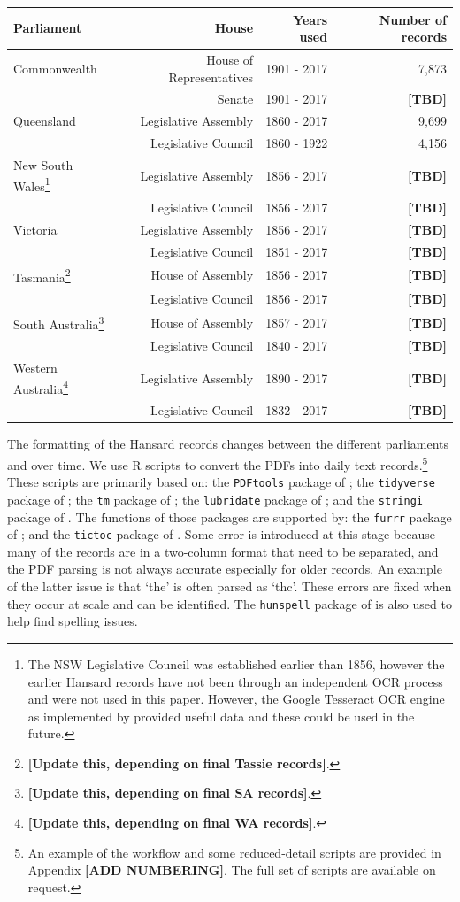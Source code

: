 \documentclass[12pt,]{article}
\theoremstyle{definition}
\theoremstyle{definition}
\theoremstyle{definition}
\theoremstyle{remark}
\begin{document}
\begin{longtable}[]{@{}lrrr@{}}
\toprule
Parliament & House & Years used & Number of records\tabularnewline
\midrule
\endhead
Commonwealth & House of Representatives & 1901 - 2017 &
7,873\tabularnewline
& Senate & 1901 - 2017 & \textbf{{[}TBD{]}}\tabularnewline
Queensland & Legislative Assembly & 1860 - 2017 & 9,699\tabularnewline
& Legislative Council & 1860 - 1922 & 4,156\tabularnewline
New South Wales\footnote{The NSW Legislative Council was established
  earlier than 1856, however the earlier Hansard records have not been
  through an independent OCR process and were not used in this paper.
  However, the Google Tesseract OCR engine as implemented by
  \citet{Ooms2018tesseract} provided useful data and these could be used
  in the future.} & Legislative Assembly & 1856 - 2017 &
\textbf{{[}TBD{]}}\tabularnewline
& Legislative Council & 1856 - 2017 & \textbf{{[}TBD{]}}\tabularnewline
Victoria & Legislative Assembly & 1856 - 2017 &
\textbf{{[}TBD{]}}\tabularnewline
& Legislative Council & 1851 - 2017 & \textbf{{[}TBD{]}}\tabularnewline
Tasmania\footnote{\textbf{{[}Update this, depending on final Tassie
  records{]}}.} & House of Assembly & 1856 - 2017 &
\textbf{{[}TBD{]}}\tabularnewline
& Legislative Council & 1856 - 2017 & \textbf{{[}TBD{]}}\tabularnewline
South Australia\footnote{\textbf{{[}Update this, depending on final SA
  records{]}}.} & House of Assembly & 1857 - 2017 &
\textbf{{[}TBD{]}}\tabularnewline
& Legislative Council & 1840 - 2017 & \textbf{{[}TBD{]}}\tabularnewline
Western Australia\footnote{\textbf{{[}Update this, depending on final WA
  records{]}}.} & Legislative Assembly & 1890 - 2017 &
\textbf{{[}TBD{]}}\tabularnewline
& Legislative Council & 1832 - 2017 & \textbf{{[}TBD{]}}\tabularnewline
\bottomrule
\end{longtable}

The formatting of the Hansard records changes between the different
parliaments and over time. We use R scripts to convert the PDFs into
daily text records.\footnote{An example of the workflow and some
  reduced-detail scripts are provided in Appendix \textbf{{[}ADD
  NUMBERING{]}}. The full set of scripts are available on request.}
These scripts are primarily based on: the \texttt{PDFtools} package of
\citet{Ooms2018pdftools}; the \texttt{tidyverse} package of
\citet{Wickham2017}; the \texttt{tm} package of
\citet{FeinererHornik2018}; the \texttt{lubridate} package of
\citet{GrolemundWickham2011}; and the \texttt{stringi} package of
\citet{Gagolewski2018}. The functions of those packages are supported
by: the \texttt{furrr} package of \citet{VaughanDancho2018}; and the
\texttt{tictoc} package of \citet{Izrailev2014}. Some error is
introduced at this stage because many of the records are in a two-column
format that need to be separated, and the PDF parsing is not always
accurate especially for older records. An example of the latter issue is
that `the' is often parsed as `thc'. These errors are fixed when they
occur at scale and can be identified. The \texttt{hunspell} package of
\citet{Ooms2017} is also used to help find spelling issues.
\end{document}
